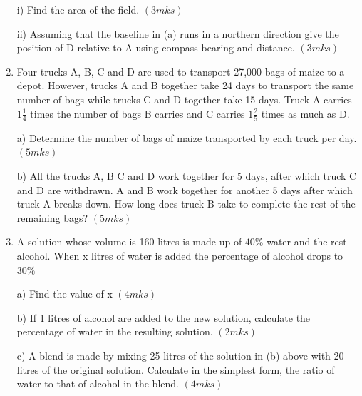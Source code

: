 \documentclass[
  a4paperpaper,
]{scrbook}
\begin{document}
\begin{tcolorbox}
\begin{enumerate}
  i) Find the area of the field. \((3mks)\)

  ii) Assuming that the baseline in (a) runs in a northern direction
  give the position of D relative to A using compass bearing and
  distance. \((3mks)\)
\item
  Four trucks A, B, C and D are used to transport 27,000 bags of maize
  to a depot. However, trucks A and B together take 24 days to transport
  the same number of bags while trucks C and D together take 15 days.
  Truck A carries \(1\frac{1}{4}\) times the number of bags B carries
  and C carries \(1\frac{2}{5}\) times as much as D.

  a) Determine the number of bags of maize transported by each truck per
  day. \((5mks)\)

  b) All the trucks A, B C and D work together for 5 days, after which
  truck C and D are withdrawn. A and B work together for another 5 days
  after which truck A breaks down. How long does truck B take to
  complete the rest of the remaining bags? \((5mks)\)
\item
  A solution whose volume is 160 litres is made up of \(40\%\) water and
  the rest alcohol. When x litres of water is added the percentage of
  alcohol drops to \(30\%\)

  a) Find the value of x \((4mks)\)

  b) If 1 litres of alcohol are added to the new solution, calculate the
  percentage of water in the resulting solution. \((2mks)\)

  c) A blend is made by mixing 25 litres of the solution in (b) above
  with 20 litres of the original solution. Calculate in the simplest
  form, the ratio of water to that of alcohol in the blend. \((4mks)\)
\end{enumerate}

\end{tcolorbox}
\end{document}
